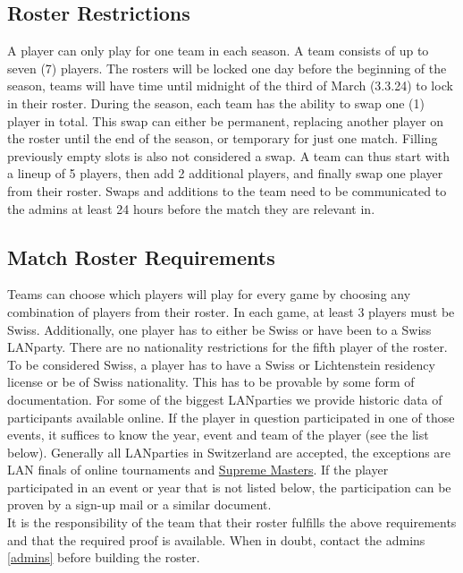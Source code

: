 \documentclass{article}
\begin{document}
\subsection{Roster Restrictions}\label{rosterrestrict}
A player can only play for one team in each season. 
A team consists of up to seven (7) players. The rosters will be locked one day before the beginning of the season, teams will have time until midnight of the third of March (3.3.24) to lock in their roster. During the season, each team has the ability to swap one (1) player in total. This swap can either be permanent, replacing another player on the roster until the end of the season, or temporary for just one match. Filling previously empty slots is also not considered a swap. A team can thus start with a lineup of 5 players, then add 2 additional players, and finally swap one player from their roster.
Swaps and additions to the team need to be communicated to the admins at least 24 hours before the match they are relevant in.

\subsection{Match Roster Requirements}\label{rosterreq}
Teams can choose which players will play for every game by choosing any combination of players from their 
roster. In each game, at least 3 players must be Swiss. Additionally, one player has to either be Swiss or
have been to a Swiss LANparty. There are no nationality restrictions for the fifth player of the roster. \\
To be considered Swiss, a player has to have a Swiss or Lichtenstein residency license or be of Swiss
nationality. This has to be provable by some form of documentation.
For some of the biggest LANparties we provide historic data of participants available online. If the player in question 
participated in one of those events, it suffices to know the year, event and team of the player (see the list below). Generally 
all LANparties in Switzerland are accepted, the exceptions are LAN finals of online tournaments and 
\href{https://www.suprememasters.gg/}{Supreme Masters}. If the player participated in an event or year that is not listed below, 
the participation can be proven by a sign-up mail or a similar document.\\
It is the responsibility of the team that their roster fulfills the above requirements and that the required proof is available. 
When in doubt, contact the admins \ref{admins} before building the roster.
\end{document}
